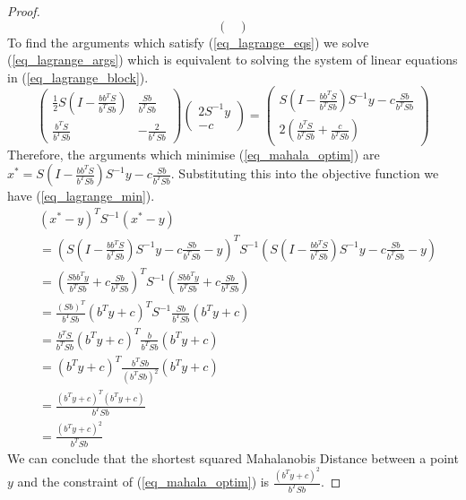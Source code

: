 \begin{proof}
\begin{equation}
\begin{pmatrix}
\end{pmatrix}
\label{eq_lagrance_block_inverse}
\end{equation}
To find the arguments which satisfy (\ref{eq_lagrange_eqs}) we solve (\ref{eq_lagrange_args}) which is equivalent to solving the system of linear equations in (\ref{eq_lagrange_block}).
\begin{equation}
\begin{pmatrix}
\frac{1}{2}S(I-\frac{bb^TS}{b^TSb}) & \frac{Sb}{b^TSb} \\ \frac{b^TS}{b^TSb} & -\frac{2}{b^TSb} \end{pmatrix} \begin{pmatrix}
2S^{-1}y \\ -c
\end{pmatrix} = \begin{pmatrix}
S(I-\frac{bb^TS}{b^TSb})S^{-1}y - c\frac{Sb}{b^TSb} \\
2(\frac{b^TS}{b^TSb} + \frac{c}{b^TSb})
\end{pmatrix}
\label{eq_lagrange_args}
\end{equation}
Therefore, the arguments which minimise (\ref{eq_mahala_optim}) are $x^* = S(I-\frac{bb^TS}{b^TSb})S^{-1}y - c\frac{Sb}{b^TSb}$. Substituting this into the objective function we have (\ref{eq_lagrange_min}).
\begin{equation}
\begin{aligned}
&\left(x^*-y\right)^TS^{-1}\left(x^*-y\right) \\ 
&= \left(S\left(I-\frac{bb^TS}{b^TSb}\right)S^{-1}y - c\frac{Sb}{b^TSb}-y\right)^TS^{-1}\left( S \left(I-\frac{bb^TS}{b^TSb}\right)S^{-1}y - c \frac{Sb}{b^TSb}-y\right) \\ 
&= \left(\frac{Sbb^Ty}{b^TSb} + c\frac{Sb}{b^TSb}\right)^TS^{-1}\left(\frac{Sbb^Ty}{b^TSb}+ c\frac{Sb}{b^TSb}\right) \\
&= \frac{(Sb)^T}{b^TSb}\left( b^Ty+c \right)^TS^{-1}\frac{Sb}{b^TSb}\left(b^Ty+c\right) \\
&= \frac{b^TS}{b^TSb}\left(b^Ty+c\right)^T\frac{b}{b^TSb}\left(b^Ty+c\right) \\
&= \left(b^Ty+c\right)^T\frac{b^TSb}{(b^TSb)^2}\left(b^Ty+c\right) \\
&= \frac{(b^Ty+c)^T(b^Ty+c)}{b^TSb} \\
&= \frac{(b^Ty+c)^2}{b^TSb}
\end{aligned}
\label{eq_lagrange_min}
\end{equation}
We can conclude that the shortest squared Mahalanobis Distance between a point $y$ and the constraint of (\ref{eq_mahala_optim}) is $\frac{(b^Ty+c)^2}{b^TSb}$.
\end{proof}
